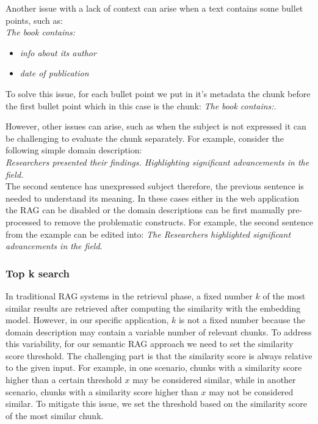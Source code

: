 Another issue with a lack of context can arise when a text contains some bullet points, such as: \\

\noindent{}\textit{The book contains:}
\begin{itemize}
\item \textit{info about its author}
\item \textit{date of publication} \\
\end{itemize}

\noindent{}To solve this issue, for each bullet point we put in it's metadata the chunk before the first bullet point which in this case is the chunk: \textit{The book contains:}.

However, other issues can arise, such as when the subject is not expressed it can be challenging to evaluate the chunk separately. For example, consider the following simple domain description: \\

\noindent{}\textit{Researchers presented their findings. Highlighting significant advancements in the field.} \\

\noindent{}The second sentence has unexpressed subject therefore, the previous sentence is needed to understand its meaning. In these cases either in the web application the RAG can be disabled or the domain descriptions can be first manually pre-processed to remove the problematic constructs. For example, the second sentence from the example can be edited into: \textit{The Researchers highlighted significant advancements in the field}. 


\subsubsection{Top k search}
\label{sec:top_k_search}

In traditional RAG systems in the retrieval phase, a fixed number $k$ of the most similar results are retrieved after computing the similarity with the embedding model. However, in our specific application, $k$ is not a fixed number because the domain description may contain a variable number of relevant chunks. To address this variability, for our semantic RAG approach we need to set the similarity score threshold. The challenging part is that the similarity score is always relative to the given input. For example, in one scenario, chunks with a similarity score higher than a certain threshold $x$ may be considered similar, while in another scenario, chunks with a similarity score higher than $x$ may not be considered similar. To mitigate this issue, we set the threshold based on the similarity score of the most similar chunk.